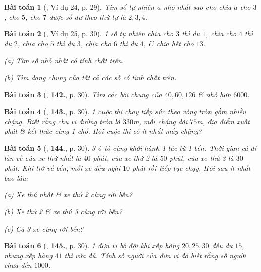 \documentclass{article}
\numberwithin{equation}{section}
\newtheorem{baitoan}{Bài toán}[section]
\begin{document}
\begin{baitoan}[\cite{Binh_Toan_6_tap_1}, Ví dụ 24, p. 29]
	Tìm số tự nhiên $a$ nhỏ nhất sao cho chia $a$ cho $3$, cho $5$, cho $7$ được số dư theo thứ tự là $2,3,4$.	
\end{baitoan}

\begin{baitoan}[\cite{Binh_Toan_6_tap_1}, Ví dụ 25, p. 30]
	1 số tự nhiên chia cho $3$ thì dư $1$, chia cho $4$ thì dư $2$, chia cho $5$ thì dư $3$, chia cho $6$ thì dư $4$, \& chia hết cho $13$.
	\begin{enumerate*}
		\item[(a)] Tìm số nhỏ nhất có tính chất trên.
		\item[(b)] Tìm dạng chung của tất cả các số có tính chất trên.
	\end{enumerate*}
\end{baitoan}

\begin{baitoan}[\cite{Binh_Toan_6_tap_1}, \textbf{142.}, p. 30]
	Tìm các bội chung của $40,60,126$ \& nhỏ hơn $6000$.
\end{baitoan}

\begin{baitoan}[\cite{Binh_Toan_6_tap_1}, \textbf{143.}, p. 30]
	1 cuộc thi chạy tiếp sức theo vòng tròn gồm nhiều chặng. Biết rằng chu vi đường tròn là $330$m, mỗi chặng dài $75$m, địa điểm xuất phát \& kết thức cùng 1 chỗ. Hỏi cuộc thi có ít nhất mấy chặng?
\end{baitoan}

\begin{baitoan}[\cite{Binh_Toan_6_tap_1}, \textbf{144.}, p. 30]
	3 ô tô cùng khởi hành 1 lúc từ 1 bến. Thời gian cả đi lẫn về của xe thứ nhất là $40$ phút, của xe thứ 2 là $50$ phút, của xe thứ 3 là $30$ phút. Khi trở về bến, mỗi xe đều nghỉ $10$ phút rồi tiếp tục chạy. Hỏi sau ít nhất bao lâu:
	\begin{enumerate*}
		\item[(a)] Xe thứ nhất \& xe thứ 2 cùng rời bến?
		\item[(b)] Xe thứ 2 \& xe thứ 3 cùng rời bến?
		\item[(c)] Cả 3 xe cùng rời bến?
	\end{enumerate*}
\end{baitoan}

\begin{baitoan}[\cite{Binh_Toan_6_tap_1}, \textbf{145.}, p. 30]
	1 đơn vị bộ đội khi xếp hàng $20,25,30$ đều dư $15$, nhưng xếp hàng $41$ thì vừa đủ. Tính số người của đơn vị đó biết rằng số người chưa đến $1000$.
\end{baitoan}
\end{document}
